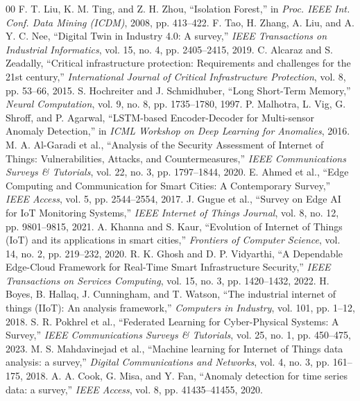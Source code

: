 \documentclass[conference]{IEEEtran}
\begin{document}
\begin{thebibliography}{00}
 F. T. Liu, K. M. Ting, and Z. H. Zhou, ``Isolation Forest,'' in \textit{Proc. IEEE Int. Conf. Data Mining (ICDM)}, 2008, pp. 413--422.
 F. Tao, H. Zhang, A. Liu, and A. Y. C. Nee, ``Digital Twin in Industry 4.0: A survey,'' \textit{IEEE Transactions on Industrial Informatics}, vol. 15, no. 4, pp. 2405--2415, 2019.
 C. Alcaraz and S. Zeadally, ``Critical infrastructure protection: Requirements and challenges for the 21st century,'' \textit{International Journal of Critical Infrastructure Protection}, vol. 8, pp. 53--66, 2015.
 S. Hochreiter and J. Schmidhuber, ``Long Short-Term Memory,'' \textit{Neural Computation}, vol. 9, no. 8, pp. 1735--1780, 1997.
 P. Malhotra, L. Vig, G. Shroff, and P. Agarwal, ``LSTM-based Encoder-Decoder for Multi-sensor Anomaly Detection,'' in \textit{ICML Workshop on Deep Learning for Anomalies}, 2016.
 M. A. Al-Garadi et al., ``Analysis of the Security Assessment of Internet of Things: Vulnerabilities, Attacks, and Countermeasures,'' \textit{IEEE Communications Surveys \& Tutorials}, vol. 22, no. 3, pp. 1797--1844, 2020.
 E. Ahmed et al., ``Edge Computing and Communication for Smart Cities: A Contemporary Survey,'' \textit{IEEE Access}, vol. 5, pp. 2544--2554, 2017.
 J. Gugue et al., ``Survey on Edge AI for IoT Monitoring Systems,'' \textit{IEEE Internet of Things Journal}, vol. 8, no. 12, pp. 9801--9815, 2021.
 A. Khanna and S. Kaur, ``Evolution of Internet of Things (IoT) and its applications in smart cities,'' \textit{Frontiers of Computer Science}, vol. 14, no. 2, pp. 219--232, 2020.
 R. K. Ghosh and D. P. Vidyarthi, ``A Dependable Edge-Cloud Framework for Real-Time Smart Infrastructure Security,'' \textit{IEEE Transactions on Services Computing}, vol. 15, no. 3, pp. 1420--1432, 2022.
 H. Boyes, B. Hallaq, J. Cunningham, and T. Watson, ``The industrial internet of things (IIoT): An analysis framework,'' \textit{Computers in Industry}, vol. 101, pp. 1--12, 2018.
 S. R. Pokhrel et al., ``Federated Learning for Cyber-Physical Systems: A Survey,'' \textit{IEEE Communications Surveys \& Tutorials}, vol. 25, no. 1, pp. 450--475, 2023.
 M. S. Mahdavinejad et al., ``Machine learning for Internet of Things data analysis: a survey,'' \textit{Digital Communications and Networks}, vol. 4, no. 3, pp. 161--175, 2018.
 A. A. Cook, G. Misa, and Y. Fan, ``Anomaly detection for time series data: a survey,'' \textit{IEEE Access}, vol. 8, pp. 41435--41455, 2020.

\end{thebibliography}
\end{document}
